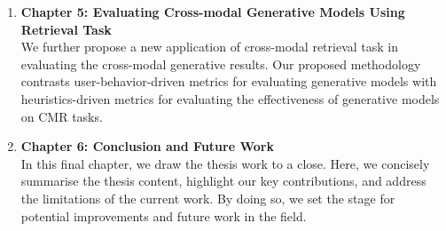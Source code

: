 \begin{enumerate}
\item \textbf{Chapter 5: Evaluating Cross-modal Generative Models Using Retrieval Task}\\ We further propose a new application of cross-modal retrieval task in evaluating the cross-modal generative results. Our proposed methodology contrasts user-behavior-driven metrics for evaluating generative models with heuristics-driven metrics for evaluating the effectiveness of generative models on CMR tasks.\\

\item \textbf{Chapter 6: Conclusion and Future Work}\\
In this final chapter, we draw the thesis work to a close. Here, we concisely summarise the thesis content, highlight our key contributions, and address the limitations of the current work. By doing so, we set the stage for potential improvements and future work in the field.

\end{enumerate}

